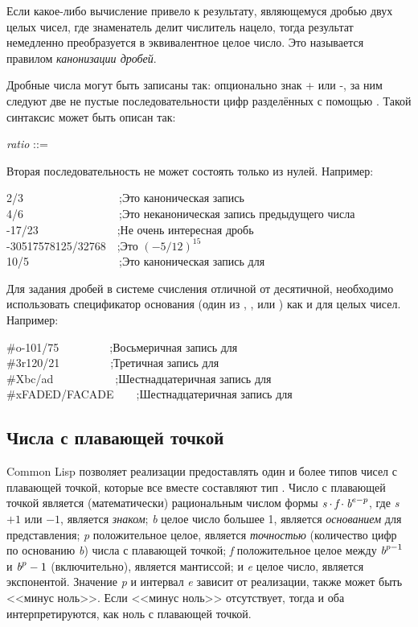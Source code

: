 Если какое-либо вычисление привело к результату, являющемуся
дробью двух целых чисел, где знаменатель делит числитель нацело,
тогда результат немедленно преобразуется в эквивалентное целое
число. Это называется правилом \emph{канонизации дробей}.

Дробные числа могут быть записаны так: опционально знак + или -,
за ним следуют две не пустые последовательности цифр разделённых с
помощью \cdf{/} . Такой синтаксис может быть описан так:

\begin{tabbing}
\emph{ratio} ::=   \cdf{/} 
\end{tabbing}

Вторая последовательность не может состоять только из
нулей. Например:  
\begin{lisp}
2/3~~~~~~~~~~~~~~~~~;\textrm{Это каноническая запись} \\
4/6~~~~~~~~~~~~~~~~~;\textrm{Это неканоническая запись предыдущего числа} \\
-17/23~~~~~~~~~~~~~~;\textrm{Не очень интересная дробь} \\
-30517578125/32768~~;\textrm{Это $(-5/12)^{15}$} \\
10/5~~~~~~~~~~~~~~~~;\textrm{Это каноническая запись для }
\end{lisp}

Для задания дробей в системе счисления отличной от десятичной, необходимо
использовать спецификатор основания (один из , ,  или ) как и для
целых чисел. Например:

\begin{lisp}
\#o-101/75~~~~~~~~~;\textrm{Восьмеричная запись для } \\
\#3r120/21~~~~~~~~~;\textrm{Третичная запись для } \\
\#Xbc/ad~~~~~~~~~~~;\textrm{Шестнадцатеричная запись для } \\
\#xFADED/FACADE~~~~;\textrm{Шестнадцатеричная запись для } 
\end{lisp}

\subsection{Числа с плавающей точкой}

Common Lisp позволяет реализации предоставлять один и более типов чисел с
плавающей точкой, которые все вместе составляют тип .
Число с плавающей точкой является (математически) рациональным числом формы
$\emph{s} \cdot \emph{f} \cdot \emph{b}^{e-p}$,
где \emph{s} $+1$ или $-1$, является \emph{знаком};
\emph{b} целое число большее 1,
является \emph{основанием} для представления;
\emph{p} положительное целое, является \emph{точностью} (количество цифр по
основанию \emph{b}) числа с плавающей точкой;
\emph{f} положительное целое между $\emph{b}^{p-1}$ и
$\emph{b}^{p}-1$ (включительно), является мантиссой;
и \emph{e} целое число, является экспонентой.
Значение \emph{p} и интервал \emph{e} зависит от реализации, также может быть
<<минус ноль>>. Если <<минус ноль>> отсутствует, тогда  и  оба
интерпретируются, как ноль с плавающей точкой.

